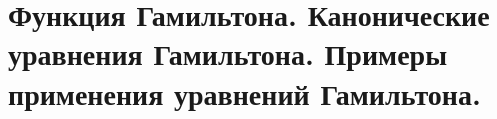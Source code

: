 \chapter{Функция Гамильтона. Канонические уравнения Гамильтона. Примеры
применения уравнений Гамильтона.}

\newpage
